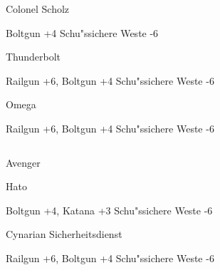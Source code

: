 \begin{column}[l]{0.45}
    \begin{nscsheet}[h]{Colonel Scholz}
        \nscstats[ATT=5,AGG=4,EMP=4,KNO=3,HP=12]
        \nscruler
        \begin{nscinventory}
            \nscitem[Waffen] Boltgun +4
            \nscitem[R"ustung] Schu"ssichere Weste -6
        \end{nscinventory}
    \end{nscsheet}

    \begin{nscsheet}[h]{Thunderbolt}
        \nscstats[ATT=9,AGG=8,EMP=2,KNO=4,HP=14]
        \nscruler
        \begin{nscinventory}
            \nscitem[Waffen] Railgun +6, Boltgun +4
            \nscitem[R"ustung] Schu"ssichere Weste -6           
        \end{nscinventory}
    \end{nscsheet}

    \begin{nscsheet}[h]{Omega}
        \nscstats[ATT=8,AGG=8,EMP=1,KNO=2,HP=12]
        \nscruler
        \begin{nscinventory}
            \nscitem[Waffen] Railgun +6, Boltgun +4
            \nscitem[R"ustung] Schu"ssichere Weste -6           
        \end{nscinventory}
    \end{nscsheet}    
\end{column}
\begin{column}[r]{0.45}
    \begin{nscsheet}[h]{Avenger}
        \nscstats[ATT=5,AGG=5,EMP=4,KNO=3,HP=12]
        \nscruler
    \end{nscsheet}
    
    \begin{nscsheet}[h]{Hato}
        \nscstats[ATT=9,AGG=8,EMP=1,KNO=2,HP=14]
        \nscruler
        \begin{nscinventory}
            \nscitem[Waffen] Boltgun +4, Katana +3
            \nscitem[R"ustung] Schu"ssichere Weste -6          
        \end{nscinventory}
    \end{nscsheet}

    \begin{nscsheet}[h]{Cynarian Sicherheitsdienst}
        \nscstats[ATT=6,AGG=5,EMP=2,KNO=4,HP=12]
        \nscruler
        \begin{nscinventory}
            \nscitem[Waffen] Railgun +6, Boltgun +4
            \nscitem[R"ustung] Schu"ssichere Weste -6           
        \end{nscinventory}
    \end{nscsheet}    
\end{column}


